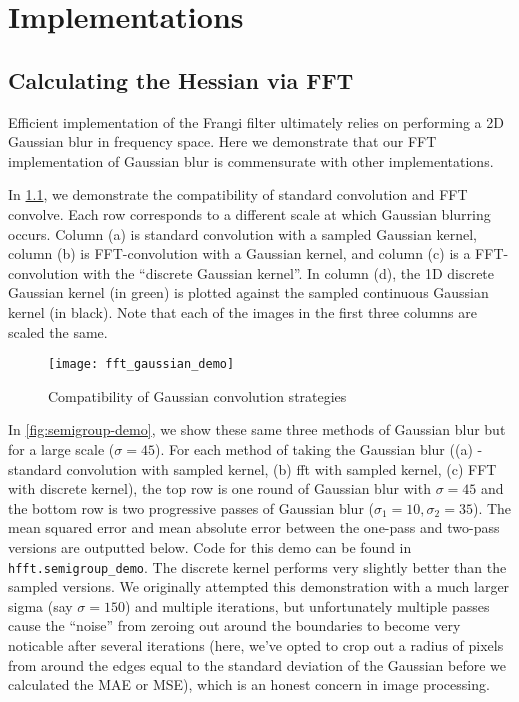 \chapter{Implementations} \label{ch:implementations}


\section{Calculating the Hessian via FFT}

Efficient implementation of the Frangi filter ultimately relies on performing a 2D Gaussian blur in frequency space. Here we demonstrate that our FFT implementation of Gaussian blur is commensurate with other implementations. 

In \cref{fig:fft-gaussian-demo}, we demonstrate the compatibility of standard convolution and FFT convolve. Each row corresponds to a different scale at which Gaussian blurring  occurs. Column (a) is standard convolution with a sampled Gaussian kernel, column (b) is FFT-convolution with a Gaussian kernel, and column (c) is a FFT-convolution with the ``discrete Gaussian kernel''. In column (d), the 1D discrete Gaussian kernel (in green) is plotted against the sampled continuous Gaussian kernel (in black). Note that each of the images in the first three columns are scaled the same.
\begin{figure}
  \texttt{[image: fft\_gaussian\_demo]}
  \caption{Compatibility of Gaussian convolution strategies}
  \label{fig:fft-gaussian-demo}
\end{figure}

In \cref{fig:semigroup-demo}, we show these same three methods of Gaussian blur but for a large scale
($\sigma=45$). For each method of taking the Gaussian blur ((a) - standard convolution with sampled kernel, (b) fft with sampled kernel, (c) FFT with discrete kernel), the top row is one round of Gaussian blur with $\sigma=45$ and the bottom row is two progressive passes of Gaussian blur ($\sigma_1 = 10, \sigma_2 = 35$). The mean squared error and mean absolute error between the one-pass and two-pass versions are outputted below. Code for this demo can be found in \texttt{hfft.semigroup\_demo}.
The discrete kernel performs very slightly better than the sampled versions. We originally attempted
this demonstration with a much larger sigma (say $\sigma=150$) and multiple iterations, but unfortunately multiple passes cause the ``noise'' from zeroing out around the boundaries to become very noticable after several iterations (here, we've opted to crop out a radius of pixels from around the edges equal to the standard deviation of the Gaussian before we calculated the MAE or MSE), which is an honest concern in image processing.

